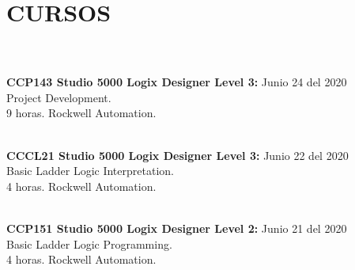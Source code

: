 \documentclass[margin]{res}
\begin{document}
\begin{resume}

\section{CURSOS}

\section{\centering}
\hfill
\\\textbf{CCP143 Studio 5000 Logix Designer Level 3:} \hfill Junio 24 del 2020
\\Project Development.
\\ 9 horas. Rockwell Automation.

\\\textbf{CCCL21 Studio 5000 Logix Designer Level 3:} \hfill Junio 22 del 2020
\\Basic Ladder Logic Interpretation.
\\ 4 horas. Rockwell Automation.

\\\textbf{CCP151 Studio 5000 Logix Designer Level 2:} \hfill Junio 21 del 2020
\\Basic Ladder Logic Programming.
\\ 4 horas. Rockwell Automation.


\end{resume}
\end{document}
